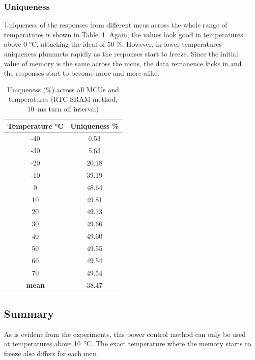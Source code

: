 \subsubsection*{Uniqueness}

Uniqueness of the responses from different \glspl{mcu} across the whole range of temperatures is shown in Table~\ref{table:uniqueness_rtc_sram}. Again, the values look good in temperatures above 0 °C, attacking the ideal of 50 \%. However, in lower temperatures uniqueness plummets rapidly as the responses start to freeze. Since the initial value of memory is the same across the \glspl{mcu}, the data remanence kicks in and the responses start to become more and more alike.

\begin{table}[ht!]
    \centering
    \begin{tabular}{cc}
    \textbf{Temperature °C} & \textbf{Uniqueness \%} \\
    \toprule
    -40  &  0.53 \\
    -30  &  5.63 \\
    -20  & 20.18 \\
    -10  & 39.19 \\
    0    & 48.64 \\
    10   & 49.81 \\
    20   & 49.73 \\
    30   & 49.66 \\
    40   & 49.60 \\
    50   & 49.55 \\
    60   & 49.54 \\
    70   & 49.54 \\
    \textbf{mean} & 38.47 \\
    \bottomrule
    \end{tabular}
    \captionsetup{justification=centering,margin=0.5cm}
    \caption{Uniqueness (\%) across all MCUs and temperatures (RTC SRAM method, 10~ms turn off interval)}
    \label{table:uniqueness_rtc_sram}
    \vspace{-0.7cm}
\end{table}

\subsection{Summary}
As is evident from the experiments, this power control method can only be used at temperatures above 10~°C. The exact temperature where the memory starts to freeze also differs for each \gls{mcu}.

